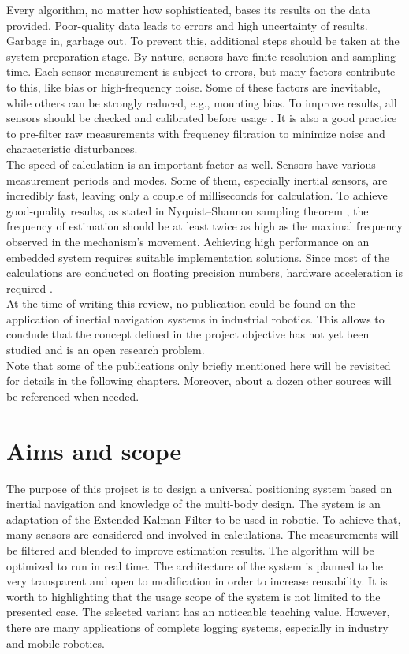 Every algorithm, no matter how sophisticated, bases its results on the data provided. Poor-quality data leads to errors and high uncertainty of results. Garbage in, garbage out. To prevent this, additional steps should be taken at the system preparation stage. By nature, sensors have finite resolution and sampling time. Each sensor measurement is subject to errors, but many factors contribute to this, like bias or high-frequency noise. Some of these factors are inevitable, while others can be strongly reduced, e.g., mounting bias. To improve results, all sensors should be checked and calibrated before usage \cite{mi13060879} \cite{Hol_2011} \cite{gyro_calib}. It is also a good practice to pre-filter raw measurements with frequency filtration \cite{BADRI20101425} to minimize noise and characteristic disturbances. \\

The speed of calculation is an important factor as well. Sensors have various measurement periods and modes. Some of them, especially inertial sensors, are incredibly fast, leaving only a couple of milliseconds for calculation. To achieve good-quality results, as stated in Nyquist–Shannon sampling theorem \cite{sample_theorem}, the frequency of estimation should be at least twice as high as the maximal frequency observed in the mechanism's movement. Achieving high performance on an embedded system requires suitable implementation solutions. Since most of the calculations are conducted on floating precision numbers, hardware acceleration is required  \cite{fpu2} \cite{fpu}.\\

At the time of writing this review, no publication could be found on the application of inertial navigation systems in industrial robotics. This allows to conclude that the concept defined in the project objective has not yet been studied and is an open research problem.\\

Note that some of the publications only briefly mentioned here will be revisited for details in the following chapters. Moreover, about a dozen other sources will be referenced when needed.

\newpage
\section{Aims and scope}

The purpose of this project is to design a universal positioning system based on inertial navigation and knowledge of the multi-body design. The system is an adaptation of the Extended Kalman Filter to be used in robotic. To achieve that, many sensors are considered and involved in calculations. The measurements will be filtered and blended to improve estimation results. The algorithm will be optimized to run in real time. The architecture of the system is planned to be very transparent and open to modification in order to increase reusability. It is worth to highlighting that the usage scope of the system is not limited to the presented case. The selected variant has an noticeable teaching value. However, there are many applications of complete logging systems, especially in industry and mobile robotics.\\

